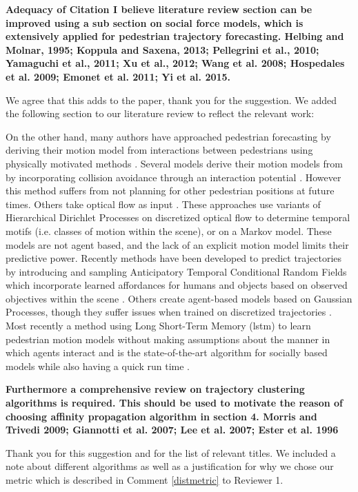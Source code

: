 \documentclass[usenames,dvipsnames]{article}
\newcommand{\Ram}[1]{{\normalsize{\textbf{({\color{green}Ram:\ }#1)}}}}
\providecommand{\response}[1]{
\noindent
\noindent\colorbox{gray!20}{
\parbox{\textwidth}{
\setlength{\parskip}{.1in}
\setlength{\parindent}{.1in}
#1}
}
}
\begin{document}
\begin{enumerate}
\begin{item}
\end{item}

\begin{item}
\textbf{Adequacy of Citation
I believe literature review section can be improved using a sub section
on social force models, which is extensively applied for pedestrian
trajectory forecasting. 
Helbing and Molnar, 1995; Koppula and Saxena, 2013; Pellegrini et al.,
2010; Yamaguchi et al., 2011; Xu et al., 2012; Wang et al. 2008;
Hospedales et al. 2009; Emonet et al. 2011; Yi et al. 2015.}
\end{item}

We agree that this adds to the paper, thank you for the suggestion. 
We added the following section to our literature review to reflect the relevant work:

\reversemarginpar{}
	\response{On the other hand, many authors have approached pedestrian forecasting by deriving their motion model from interactions between pedestrians using physically motivated methods \cite{Helbing1995,Xu2012}. 
	Several models derive their motion models from \cite{Helbing1995} by incorporating collision avoidance through an interaction potential \cite{Pellegrini2009,Yamaguchi2011,Yi2016}. 
	However this method suffers from not planning for other pedestrian positions at future times. 
	Others take optical flow as input \cite{Hospedales2009,Wang2009,Emonet2011}.
	These approaches use variants of Hierarchical Dirichlet Processes on discretized optical flow to determine temporal motifs (i.e. classes of motion within the scene), or on a Markov model. 
	 These models are not agent based, and the lack of an explicit motion model limits their predictive power. 
	 Recently methods have been developed to predict trajectories by introducing and sampling Anticipatory Temporal Conditional Random Fields which incorporate learned affordances for humans and objects based on observed objectives within the scene \cite{Koppula2016}. 
	 Others create agent-based models based on Gaussian Processes, though they suffer issues when trained on discretized trajectories \cite{Tay2008,Wang2008,Trautman2015}. 
	Most recently a method using Long Short-Term Memory (lstm) to learn pedestrian motion models without making assumptions about the manner in which agents interact and is the state-of-the-art algorithm for socially based models while also having a quick run time \cite{Alahi2016}.}

\begin{item}
\textbf{Furthermore a comprehensive review on trajectory clustering algorithms
is required. This should be used to motivate the reason of choosing
affinity propagation algorithm in section 4. 
Morris and Trivedi 2009; Giannotti et al. 2007; Lee et al. 2007;
Ester et al. 1996 }

Thank you for this suggestion and for the list of relevant titles.
 We included a note about different algorithms as well as a justification for why we chose our metric which is described in Comment \ref{distmetric} to Reviewer 1. 

\end{item}
\end{enumerate}
\end{document}
